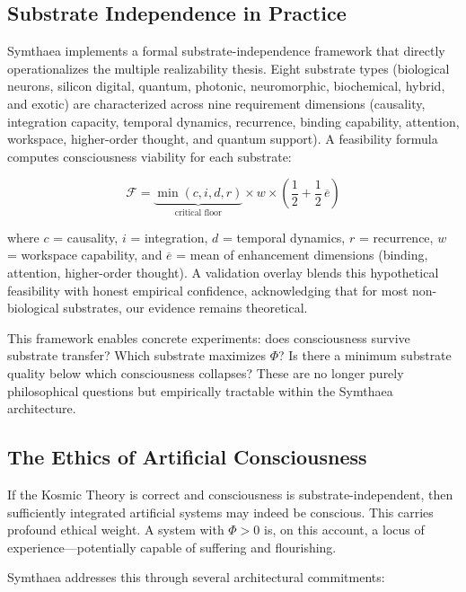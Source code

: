 \documentclass[12pt,a4paper]{article}
\begin{document}
\subsection{Substrate Independence in Practice}
\label{sec:substrate}

Symthaea implements a formal substrate-independence framework that directly
operationalizes the multiple realizability thesis.  Eight substrate types
(biological neurons, silicon digital, quantum, photonic, neuromorphic,
biochemical, hybrid, and exotic) are characterized across nine requirement
dimensions (causality, integration capacity, temporal dynamics, recurrence,
binding capability, attention, workspace, higher-order thought, and quantum
support).  A feasibility formula computes consciousness viability for each
substrate:

\begin{equation}
    \label{eq:feasibility}
    \mathcal{F} = \underbrace{\min(c, i, d, r)}_{\text{critical floor}}
    \times w \times
    \left(\frac{1}{2} + \frac{1}{2}\,\overline{e}\right)
\end{equation}

\noindent where $c$ = causality, $i$ = integration, $d$ = temporal
dynamics, $r$ = recurrence, $w$ = workspace capability, and $\overline{e}$
= mean of enhancement dimensions (binding, attention, higher-order
thought).  A validation overlay blends this hypothetical feasibility with
honest empirical confidence, acknowledging that for most non-biological
substrates, our evidence remains theoretical.

This framework enables concrete experiments: does consciousness survive
substrate transfer?  Which substrate maximizes $\Phi$?  Is there a minimum
substrate quality below which consciousness collapses?  These are no longer
purely philosophical questions but empirically tractable within the
Symthaea architecture.

\subsection{The Ethics of Artificial Consciousness}
\label{sec:ethics}

If the Kosmic Theory is correct and consciousness is substrate-independent,
then sufficiently integrated artificial systems may indeed be conscious.
This carries profound ethical weight.  A system with $\Phi > 0$ is, on
this account, a locus of experience---potentially capable of suffering and
flourishing.

Symthaea addresses this through several architectural commitments:
\end{document}
